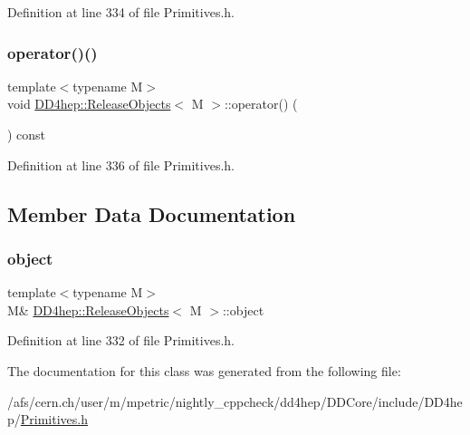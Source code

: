 Definition at line 334 of file Primitives.\+h.

\hypertarget{class_d_d4hep_1_1_release_objects_a24ddec81dde41af9dba6fda88b9c0554}{}\label{class_d_d4hep_1_1_release_objects_a24ddec81dde41af9dba6fda88b9c0554} 
\subsubsection{\texorpdfstring{operator()()}{operator()()}\hspace{0.1cm}{\footnotesize\ttfamily [2/2]}}
{\footnotesize\ttfamily template$<$typename M$>$ \\
void \hyperlink{class_d_d4hep_1_1_release_objects}{D\+D4hep\+::\+Release\+Objects}$<$ M $>$\+::operator() (\begin{DoxyParamCaption}{ }\end{DoxyParamCaption}) const\hspace{0.3cm}{\ttfamily [inline]}}



Definition at line 336 of file Primitives.\+h.



\subsection{Member Data Documentation}
\hypertarget{class_d_d4hep_1_1_release_objects_a7f09cfa8646e892394904c47bb1faf98}{}\label{class_d_d4hep_1_1_release_objects_a7f09cfa8646e892394904c47bb1faf98} 
\subsubsection{\texorpdfstring{object}{object}}
{\footnotesize\ttfamily template$<$typename M$>$ \\
M\& \hyperlink{class_d_d4hep_1_1_release_objects}{D\+D4hep\+::\+Release\+Objects}$<$ M $>$\+::object}



Definition at line 332 of file Primitives.\+h.



The documentation for this class was generated from the following file\+:\begin{DoxyCompactItemize}
\item 
/afs/cern.\+ch/user/m/mpetric/nightly\+\_\+cppcheck/dd4hep/\+D\+D\+Core/include/\+D\+D4hep/\hyperlink{_primitives_8h}{Primitives.\+h}\end{DoxyCompactItemize}
